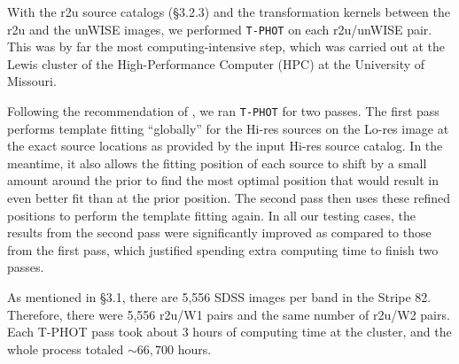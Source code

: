 \documentclass[apj,iop]{emulateapj}
\begin{document}

With the r2u source catalogs (\S 3.2.3) and the transformation kernels between the r2u and the unWISE images, we performed {\tt T-PHOT} on each r2u/unWISE pair. This was by far the most computing-intensive step, which was carried out at the Lewis cluster of the High-Performance Computer (HPC) at the University of Missouri.

Following the recommendation of \citet[][]{Merlin2015}, we ran {\tt T-PHOT} for two passes. The first pass performs template fitting “globally” for the Hi-res sources on the Lo-res image at the exact source locations as provided by the input Hi-res source catalog. In the meantime, it also allows the fitting position of each source to shift by a small amount around the prior to find the most optimal position that would result in even better fit than at the prior position. The second pass then uses these refined positions to perform the template fitting again. In all our testing cases, the results from the second pass were significantly improved as compared to those from the first pass, which justified spending extra computing time to finish two passes.

As mentioned in \S 3.1, there are 5,556 SDSS images per band in the Stripe 82. Therefore, there were 5,556 r2u/W1 pairs and the same number of r2u/W2 pairs. Each T-PHOT pass took about 3 hours of computing time at the cluster, and the whole process totaled $\sim 66,700$ hours.
\end{document}
